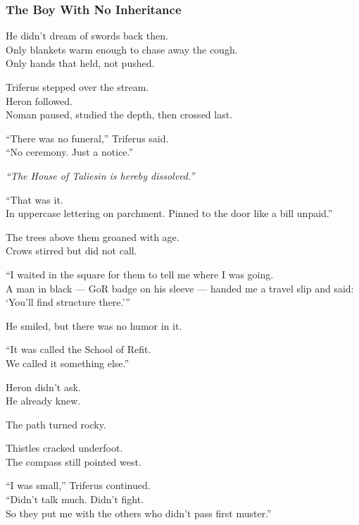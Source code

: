 \documentclass[12pt]{article}
\begin{document}
\dotfill


\subsubsection*{The Boy With No Inheritance}

He didn’t dream of swords back then.\\
Only blankets warm enough to chase away the cough.\\
Only hands that held, not pushed.

\vspace{1em}

Triferus stepped over the stream.\\
Heron followed.\\
Noman paused, studied the depth, then crossed last.

“There was no funeral,” Triferus said.\\
“No ceremony. Just a notice.”

\textit{“The House of Taliesin is hereby dissolved.”}

“That was it.\\
In uppercase lettering on parchment. Pinned to the door like a bill unpaid.”

\vspace{1em}

The trees above them groaned with age.\\
Crows stirred but did not call.

“I waited in the square for them to tell me where I was going.\\
A man in black — GoR badge on his sleeve — handed me a travel slip and said: ‘You’ll find structure there.’”

He smiled, but there was no humor in it.

“It was called the School of Refit.\\
We called it something else.”

Heron didn’t ask.\\
He already knew.

\vspace{1em}

The path turned rocky.

Thistles cracked underfoot.\\
The compass still pointed west.

“I was small,” Triferus continued.\\
“Didn’t talk much. Didn’t fight.\\
So they put me with the others who didn’t pass first muster.”
\end{document}
